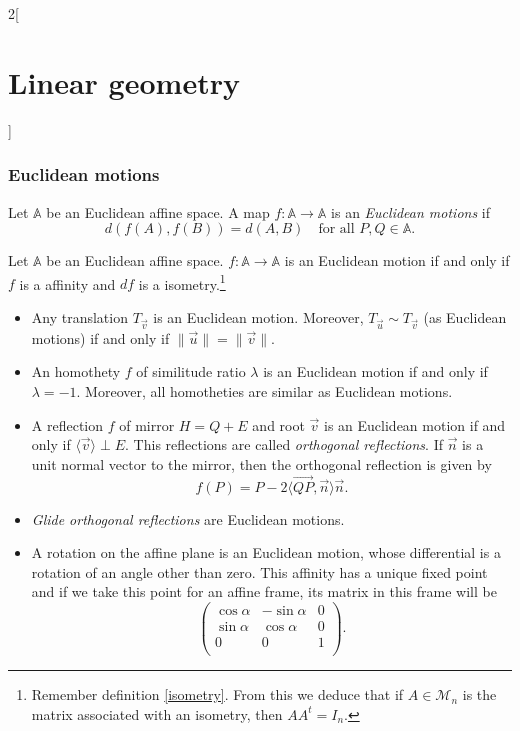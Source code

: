 \documentclass[class=article,10pt,crop=false]{standalone}
\begin{document}
\begin{multicols}{2}[\section{Linear geometry}]
\subsubsection*{Euclidean motions}
\begin{definition}
Let $\mathbb{A}$ be an Euclidean affine space. A map $f:\mathbb{A}\rightarrow\mathbb{A}$ is an \textit{Euclidean motions} if $$d(f(A),f(B))=d(A,B)\quad\text{for all } P,Q\in\mathbb{A}.$$
\end{definition}
\begin{prop}
Let $\mathbb{A}$ be an Euclidean affine space. $f:\mathbb{A}\rightarrow\mathbb{A}$ is an Euclidean motion if and only if $f$ is a affinity and $df$ is a isometry.\footnote{Remember definition \ref{isometry}. From this we deduce that if $A\in\mathcal{M}_n$ is the matrix associated with an isometry, then $AA^t=I_n$.}
\end{prop}
\begin{prop}
\hfill
\begin{itemize}
    \item Any translation $T_{\overrightarrow{v}}$ is an Euclidean motion. Moreover, $T_{\overrightarrow{u}}\sim T_{\overrightarrow{v}}$ (as Euclidean motions) if and only if $\|\overrightarrow{u}\|=\|\overrightarrow{v}\|.$
    \item An homothety $f$ of similitude ratio $\lambda$ is an Euclidean motion if and only if $\lambda=-1$. Moreover, all homotheties are similar as Euclidean motions.
    \item A reflection $f$ of mirror $H=Q+E$ and root $\overrightarrow{v}$ is an Euclidean motion if and only if $\langle\overrightarrow{v}\rangle\perp E$. This reflections are called \textit{orthogonal reflections}. If $\overrightarrow{n}$ is a unit normal vector to the mirror, then the orthogonal reflection is given by $$f(P)=P-2\langle\overrightarrow{QP},\overrightarrow{n}\rangle\overrightarrow{n}.$$
    \item \textit{Glide orthogonal reflections} are Euclidean motions.
    \item A rotation on the affine plane is an Euclidean motion, whose differential is a rotation of an angle other than zero. This affinity has a unique fixed point and if we take this point for an affine frame, its matrix in this frame will be $$\begin{pmatrix}
    \cos\alpha & -\sin\alpha & 0\\
    \sin\alpha & \cos\alpha & 0\\
    0 & 0 & 1\\
    \end{pmatrix}.$$
\end{itemize}
\end{prop}

\end{multicols}
\end{document}
